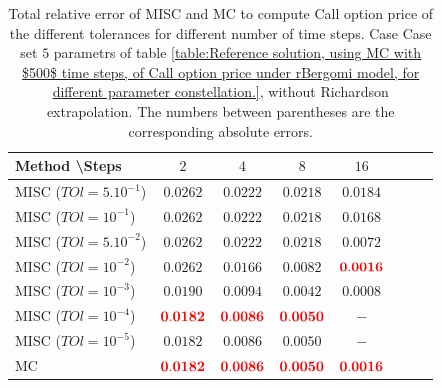\documentclass[11pt]{article}
\begin{document}
\begin{table}[h!]
	\centering
	\begin{tabular}{l*{6}{c}r}
		Method \textbackslash  Steps            & $2$ & $4$ & $8$ & $16$  \\
		\hline
		MISC ($TOl=5.10^{-1}$)  & $\mathbf{0.0262}$ & $\mathbf{0.0222}$ & $\mathbf{ 0.0218}$ & $\mathbf{ 0.0184}$  \\
		MISC ($TOl=10^{-1}$)  &  $\mathbf{0.0262}$ & $\mathbf{0.0222}$& $\mathbf{ 0.0218}$ & $\mathbf{ 0.0168}$   \\
		MISC ($TOl=5.10^{-2}$)  & $\mathbf{0.0262}$ & $\mathbf{0.0222}$ & $\mathbf{ 0.0218}$ & $\mathbf{ 0.0072}$  \\
		MISC ($TOl=10^{-2}$)  &  $\mathbf{0.0262}$ & $\mathbf{0.0166}$& $\mathbf{ 0.0082}$ & $\mathbf{ {\color{red}0.0016}}$  \\
		MISC ($TOl=10^{-3}$)  &  $\mathbf{0.0190}$ & $\mathbf{0.0094}$& $\mathbf{0.0042}$ & $\mathbf{ 0.0008}$  \\
		MISC ($TOl=10^{-4}$)  &  $\mathbf{{\color{red}0.0182}}$ & $\mathbf{{\color{red}0.0086}}$& $\mathbf{{\color{red}0.0050}}$ & $\mathbf{ -}$ \\
			MISC ($TOl=10^{-5}$)  &  $\mathbf{0.0182}$ & $\mathbf{0.0086}$& $\mathbf{0.0050}$ & $\mathbf{ -}$ 
			 \\
		\hline
		MC    & $\mathbf{{\color{red}0.0182}}$  & $\mathbf{ {\color{red}0.0086}}$  & $\mathbf{{\color{red}0.0050}}$ & $\mathbf{ {\color{red}0.0016}}$  \\		
		\hline
	\end{tabular}
	\caption{Total relative error of MISC and MC to compute Call option price of the different tolerances for different number of time steps. Case Case set $5$ parametrs of table \ref{table:Reference solution, using MC with $500$ time steps, of Call option price under rBergomi model, for different parameter constellation.}, without Richardson extrapolation. The numbers between parentheses are the corresponding absolute errors.}
	\label{Total error of MISC and MC to compute Call option price of the different tolerances for different number of time steps. Case set 5, without Richardson extrapolation. The numbers between parentheses are the corresponding absolute errors.}
\end{table}
\end{document}
